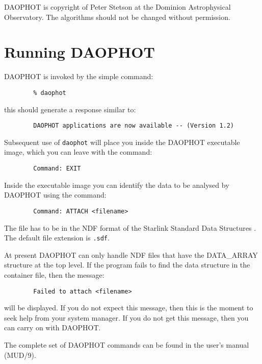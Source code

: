 DAOPHOT is copyright of Peter Stetson at the Dominion Astrophysical Observatory.
The algorithms should not be changed without permission.


\section{Running DAOPHOT}

\label{sec:running}

DAOPHOT is invoked by the simple command:

\begin{verbatim}
        % daophot
\end{verbatim}

this should generate a response similar to:

\begin{verbatim}
        DAOPHOT applications are now available -- (Version 1.2)
\end{verbatim}

Subsequent use of {\tt daophot} will place you inside the DAOPHOT executable image,
which you can leave with the command:

\begin{verbatim}
        Command: EXIT
\end{verbatim}

Inside the executable image you can identify the data to be analysed by DAOPHOT
using the command:

\begin{verbatim}
        Command: ATTACH <filename>
\end{verbatim}

The file has to be in the NDF format of the Starlink Standard Data Structures
. The default file extension is {\tt .sdf}.

At present DAOPHOT can only handle NDF files that have the DATA\_ARRAY structure at
the top level. If the program fails to find the data structure in the container
file, then the message:

\begin{verbatim}
        Failed to attach <filename>
\end{verbatim}

will be displayed. If you do not expect this message, then this is the moment to
seek help from your system manager. If you do not get this message, then you can
carry on with DAOPHOT.

The complete set of DAOPHOT commands can be found in the user's manual (MUD/9).

